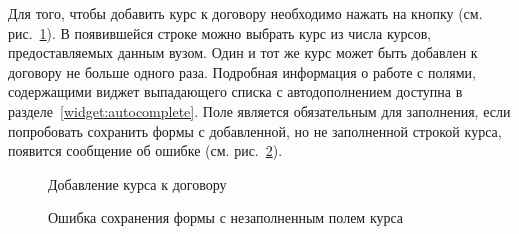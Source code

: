 \begin{itemize}
		Для того, чтобы добавить курс к договору необходимо нажать на кнопку (см. рис.~\ref{agreement:edit_course_add}). В появившейся строке можно выбрать курс из числа курсов, предоставляемых данным вузом. Один и тот же курс может быть добавлен к договору не больше одного раза. Подробная информация о работе с полями, содержащими виджет выпадающего списка с автодополнением доступна в разделе~\ref{widget:autocomplete}. Поле  является обязательным для заполнения, если попробовать сохранить формы с добавленной, но не заполненной строкой курса, появится сообщение об ошибке (см. рис.~\ref{agreement:edit_course_required}).
		
		\begin{figure}[H]
		\caption{Добавление курса к договору}
		\label{agreement:edit_course_add}
		\end{figure}	
		
		\begin{figure}[H]
		\caption{Ошибка сохранения формы с незаполненным полем курса}
		\label{agreement:edit_course_required}
		\end{figure}	
		

\end{itemize}
